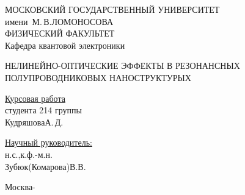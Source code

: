 \begin{titlepage}

\begin{center}
\large
МОСКОВСКИЙ ГОСУДАРСТВЕННЫЙ УНИВЕРСИТЕТ\\
имени~М.\,В.\;ЛОМОНОСОВА\\
ФИЗИЧЕСКИЙ ФАКУЛЬТЕТ\\
Кафедра квантовой электроники
\end{center}

\vfill

\begin{center}
\large
НЕЛИНЕЙНО-ОПТИЧЕСКИЕ ЭФФЕКТЫ В РЕЗОНАНСНЫХ ПОЛУПРОВОДНИКОВЫХ НАНОСТРУКТУРЫХ
\end{center}

\vfill

\begin{flushright}
    \begin{minipage}{0.35\textwidth}
    \underline{Курсовая работа}\\
    студента 214 группы\\
    Кудряшова\;А.\,Д.
    \end{minipage}
\end{flushright}
\vspace*{6mm}
\begin{flushright}
    \begin{minipage}{0.35\textwidth}
    \underline{Научный руководитель:}\\
    н.с.,\;к.ф.-м.н.\\
    Зубюк(Комарова)\;В.В.\\
    \end{minipage}
\end{flushright}

\vfill

\centerline{Москва\;-}

\end{titlepage}
